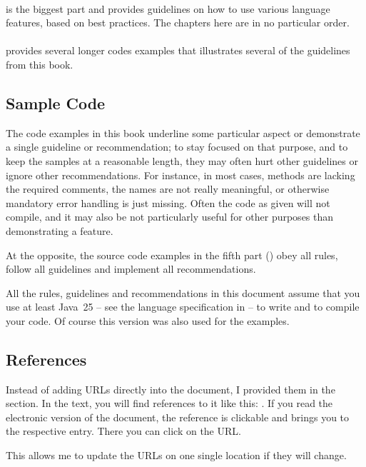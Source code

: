 \paragraph{} is the biggest part and provides guidelines on how to use various language features, based on best practices. The chapters here are in no particular order.

\paragraph{} provides several longer codes examples that illustrates several of the guidelines from this book.

\subsection{Sample Code}
The code examples in this book underline some particular aspect or demonstrate a single guideline or recommendation; to stay focused on that purpose, and to keep the samples at a reasonable length, they may often hurt other guidelines or ignore other recommendations. For instance, in most cases, methods are lacking the required comments, the names are not really meaningful, or otherwise mandatory error handling is just missing. Often the code as given will not compile, and it may also be not particularly useful for other purposes than demonstrating a feature.

At the opposite, the source code examples in the fifth part () obey all rules, follow all guidelines and implement all recommendations.

All the rules, guidelines and recommendations in this document assume that you use at least Java~25 – see the language specification in \autocite{ORACLE_DOC_LANGUAGE_SPECIFICATION} – to write and to compile your code. Of course this version was also used for the examples.

\subsection{References}
Instead of adding URLs directly into the document, I provided them in the  section. In the text, you will find references to it like this: \autocite{ORACLE_DOC_LANGUAGE_SPECIFICATION}. If you read the electronic version of the document, the reference is clickable and brings you to the respective entry. There you can click on the URL.

This allows me to update the URLs on one single location if they will change. 

